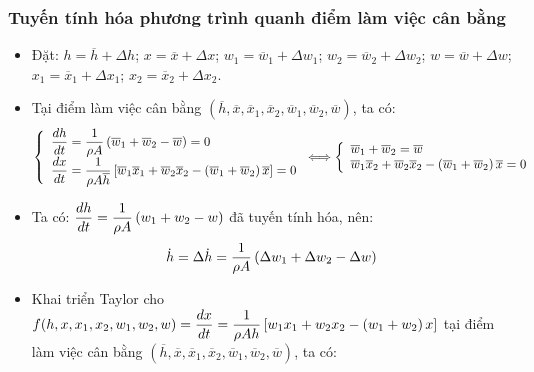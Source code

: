 \subsubsection{Tuyến tính hóa phương trình quanh điểm làm việc cân bằng}
    \begin{itemize}
        \item Đặt: $h = \overline{h} + \Delta h$; $x = \overline{x} + \Delta x$; $w_1 = \overline{w}_1 + \Delta w_1$; $w_2 = \overline{w}_2 + \Delta w_2$; $w = \overline{w} + \Delta w$; $x_1 = \overline{x}_1 + \Delta x_1$; $x_2 = \overline{x}_2 + \Delta x_2$.
        \item Tại điểm làm việc cân bằng $(\overline{h}, \overline{x}, \overline{x}_1, \overline{x}_2, \overline{w}_1, \overline{w}_2, \overline{w})$, ta có:
            \begin{align*}
                \left\{\begin{array}{l}
                    \dfrac{dh}{dt}  = \dfrac{1}{\rho A} \left({\overline{w}_1 + \overline{w}_2 - \overline{w}}\right) = 0 \\
                    \dfrac{dx}{dt}  = \dfrac{1}{\rho A \overline{h}} \left[{\overline{w}_1 \overline{x}_1 + \overline{w}_2 \overline{x}_2 - \left({\overline{w}_1 + \overline{w}_2}\right)\overline{x}}\right] = 0
                \end{array}\right.
                \Longleftrightarrow
                \left\{\begin{array}{l}
                     \overline{w}_1 + \overline{w}_2 = \overline{w} \\
                    \overline{w}_1\overline{x}_2 + \overline{w}_2\overline{x}_2 - \left({\overline{w}_1 + \overline{w}_2}\right)\overline{x} = 0
                \end{array}\right.
            \end{align*}
        \item Ta có: $\dfrac{dh}{dt}  = \dfrac{1}{\rho A} \left({w_1 + w_2 - w}\right)$ đã tuyến tính hóa, nên:
            \begin{align*}
                \dot{h} = \Delta \dot{h} = \dfrac{1}{\rho A} \left({\Delta w_1 + \Delta w_2 - \Delta w}\right)
            \end{align*}
        \item Khai triển Taylor cho $f(h, x, x_1, x_2, w_1, w_2, w) = \dfrac{dx}{dt}  = \dfrac{1}{\rho A h} \left[{w_1x_1 + w_2x_2 - \left({w_1 + w_2}\right)x}\right]$ tại điểm làm việc cân bằng $(\overline{h}, \overline{x}, \overline{x}_1, \overline{x}_2, \overline{w}_1, \overline{w}_2, \overline{w})$, ta có:
            \begin{align*}

\end{align*}
\end{itemize}

